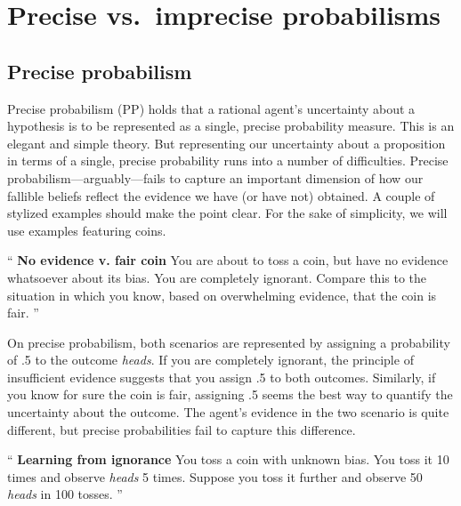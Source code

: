\documentclass[
  10pt,
  dvipsnames,enabledeprecatedfontcommands]{scrartcl}
\renewenvironment{quote}
{\list{}{\leftmargin=1em\rightmargin=1em}\item[]``}
{''\endlist}
\begin{document}

\hypertarget{precise-vs.-imprecise-probabilisms}{%
\section{Precise vs.~imprecise
probabilisms}\label{precise-vs.-imprecise-probabilisms}}

\label{sec:three-probabilism}

\hypertarget{precise-probabilism}{%
\subsection{Precise probabilism}\label{precise-probabilism}}

Precise probabilism (\textsf{PP}) holds that a rational agent's
uncertainty about a hypothesis is to be represented as a single, precise
probability measure. This is an elegant and simple theory. But
representing our uncertainty about a proposition in terms of a single,
precise probability runs into a number of difficulties. Precise
probabilism---arguably---fails to capture an important dimension of how
our fallible beliefs reflect the evidence we have (or have not)
obtained. A couple of stylized examples should make the point clear. For
the sake of simplicity, we will use examples featuring coins.

\begin{quote}
\textbf{No evidence v. fair coin}
You are about to toss a coin, but have no evidence 
whatsoever about its bias. You are completely ignorant. 
Compare this to the situation in which you know, 
based on overwhelming evidence, that the coin is fair. 
\end{quote}

\noindent On precise probabilism, both scenarios are represented by
assigning a probability of .5 to the outcome \emph{heads}. If you are
completely ignorant, the principle of insufficient evidence suggests
that you assign .5 to both outcomes. Similarly, if you know for sure the
coin is fair, assigning .5 seems the best way to quantify the
uncertainty about the outcome. The agent's evidence in the two scenario
is quite different, but precise probabilities fail to capture this
difference.

\begin{quote}
\textbf{Learning from ignorance}
You toss a coin with unknown bias. You toss it 10 times and observe \emph{heads} 5 times. Suppose you toss it further and observe 50 \emph{heads} in 100 tosses. 
\end{quote}
\end{document}
